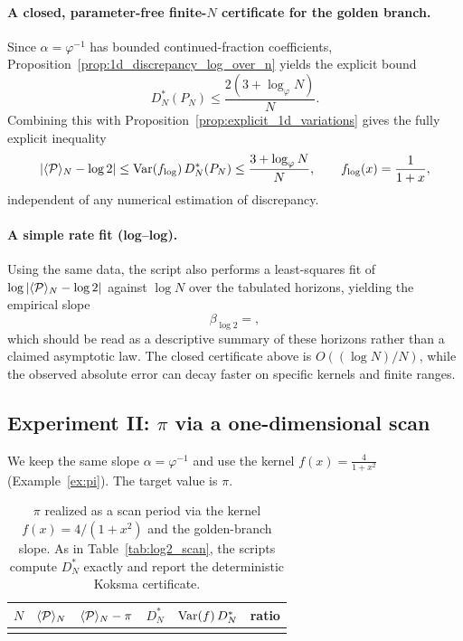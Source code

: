 \paragraph{A closed, parameter-free finite-$N$ certificate for the golden branch.}
Since $\alpha=\varphi^{-1}$ has bounded continued-fraction coefficients, Proposition~\ref{prop:1d_discrepancy_log_over_n} yields the explicit bound
\[
D_N^\ast(P_N)\le \frac{2(3+\log_\varphi N)}{N}.
\]
Combining this with Proposition~\ref{prop:explicit_1d_variations} gives the fully explicit inequality
\[
|\langle \mathcal{P} \rangle_N-\log 2|
\le \mathrm{Var}(f_{\log})\,D_N^\ast(P_N)
\le \frac{3+\log_\varphi N}{N},
\qquad f_{\log}(x)=\frac{1}{1+x},
\]
independent of any numerical estimation of discrepancy.

\paragraph{A simple rate fit (log--log).}
Using the same data, the script also performs a least-squares fit of $\log|\langle \mathcal{P} \rangle_N-\log 2|$ against $\log N$ over the tabulated horizons, yielding the empirical slope
\[
\beta_{\log 2}=,
\]
which should be read as a descriptive summary of these horizons rather than a claimed asymptotic law. The closed certificate above is $O((\log N)/N)$, while the observed absolute error can decay faster on specific kernels and finite ranges.

\subsection{Experiment II: \texorpdfstring{$\pi$}{pi} via a one-dimensional scan}
\label{sec:exp_pi}

We keep the same slope $\alpha=\varphi^{-1}$ and use the kernel $f(x)=\frac{4}{1+x^2}$ (Example~\ref{ex:pi}). The target value is $\pi$.

\begin{table}[t]
\centering
\begin{tabular}{@{}rrrrrr@{}}
\toprule
$N$ & $\langle \mathcal{P} \rangle_N$ & $\langle \mathcal{P} \rangle_N-\pi$ & $D_N^\ast$ & $\mathrm{Var}(f)\,D_N^\ast$ & ratio \\
\midrule

\\
\bottomrule
\end{tabular}
\caption{$\pi$ realized as a scan period via the kernel $f(x)=4/(1+x^2)$ and the golden-branch slope. As in Table~\ref{tab:log2_scan}, the scripts compute $D_N^\ast$ exactly and report the deterministic Koksma certificate.}
\label{tab:pi_scan}
\end{table}

